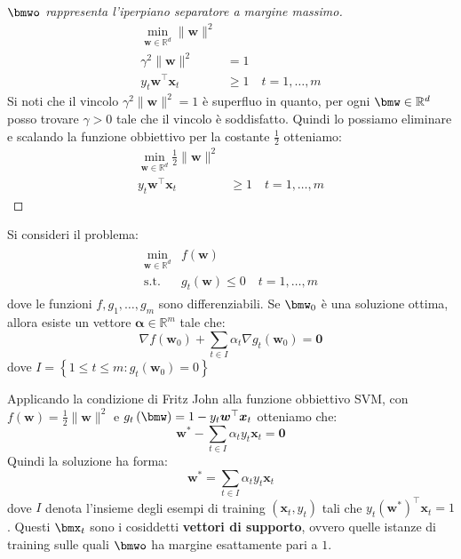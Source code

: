 \documentclass[\main/main.tex]{subfiles}
\begin{document}
\begin{multicols}{2}
\begin{proof}[\(\bmwo\) rappresenta l'iperpiano separatore a margine massimo]
    \begin{align*}
        \min _{\boldsymbol{w} \in \mathbb{R}^{d}}\|\boldsymbol{w}\|^{2}&\\
        \gamma^{2}\|\boldsymbol{w}\|^{2}&=1\\
        y_{t} \boldsymbol{w}^{\top} \boldsymbol{x}_{t} &\geq 1 \quad t=1, \ldots, m
    \end{align*}
    Si noti che il vincolo \(\gamma^{2}\|\boldsymbol{w}\|^{2}=1\) è superfluo in quanto, per ogni \(\bmw \in \R^d\) posso trovare \(\gamma > 0\) tale che il vincolo è soddisfatto. Quindi lo possiamo eliminare e scalando la funzione obbiettivo per la costante \(\frac{1}{2}\) otteniamo:
    \begin{align*}
        \min _{\boldsymbol{w} \in \mathbb{R}^{d}} \frac{1}{2}\|\boldsymbol{w}\|^{2}&\\
        y_{t} \boldsymbol{w}^{\top} \boldsymbol{x}_{t} &\geq 1 \quad t=1, \ldots, m
    \end{align*}
\end{proof}
\begin{lemma}
    Si consideri il problema:
    \begin{align*}
        \begin{array}{ll}{\min _{\boldsymbol{w} \in \mathbb{R}^{d}}} & {f(\boldsymbol{w})} \\ {\text {s.t.}} & {g_{t}(\boldsymbol{w}) \leq 0 \quad t=1, \ldots, m}\end{array}
    \end{align*}
    dove le funzioni \(f, g_{1}, \dots, g_{m}\) sono differenziabili. Se \(\bmw_0\) è una soluzione ottima, allora esiste un vettore \(\boldsymbol{\alpha} \in \mathbb{R}^{m}\) tale che:
    \[\nabla f\left(\boldsymbol{w}_{0}\right)+\sum_{t \in I} \alpha_{t} \nabla g_{t}\left(\boldsymbol{w}_{0}\right)=\mathbf{0}\]
    dove \(I=\left\{1 \leq t \leq m : g_{t}\left(\boldsymbol{w}_{0}\right)=0\right\}\)
\end{lemma}
\begin{observation}
    Applicando la condizione di Fritz John alla funzione obbiettivo SVM, con \(f(\boldsymbol{w})=\frac{1}{2}\|\boldsymbol{w}\|^{2}\) e \(g_t\rnd{\bmw} = 1-y_{t} \boldsymbol{w}^{\top} \boldsymbol{x}_{t}\) otteniamo che:
    \[
        \boldsymbol{w}^{*}-\sum_{t \in I} \alpha_{t} y_{t} \boldsymbol{x}_{t}=\mathbf{0}
    \]
    Quindi la soluzione ha forma:
    \[
        \boldsymbol{w}^{*}=\sum_{t \in I} \alpha_{t} y_{t} \boldsymbol{x}_{t}
    \]
    dove \(I\) denota l'insieme degli esempi di training \(\left(\boldsymbol{x}_{t}, y_{t}\right)\) tali che \(y_{t}\left(\boldsymbol{w}^{*}\right)^{\top} \boldsymbol{x}_{t}=1\). Questi \(\bmx_t\) sono i cosiddetti \textbf{vettori di supporto}, ovvero quelle istanze di training sulle quali \(\bmwo\) ha margine esattamente pari a \(1\).
    

\end{observation}
\end{multicols}
\end{document}
